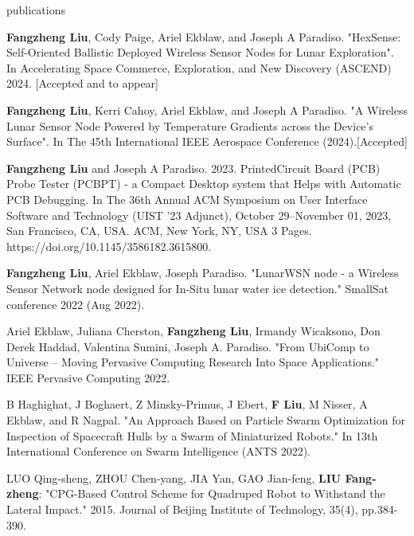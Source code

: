 \documentclass{resume} %
\begin{document}
\begin{rSection}{publications}
\begin{itemlabel}
\item \textbf{Fangzheng Liu}, Cody Paige, Ariel Ekblaw, and Joseph A Paradiso. "HexSense: Self-Oriented Ballistic Deployed Wireless Sensor Nodes for Lunar Exploration". In Accelerating Space Commerce, Exploration, and New Discovery (ASCEND) 2024. [Accepted and to appear]
\smallskip
\smallskip
\smallskip

\item \textbf{Fangzheng Liu}, Kerri Cahoy, Ariel Ekblaw, and Joseph A Paradiso. "A Wireless Lunar Sensor Node Powered by Temperature Gradients across the Device's Surface". In The 45th International IEEE Aerospace Conference (2024).[Accepted]
\smallskip
\smallskip
\smallskip

\item \textbf{Fangzheng Liu} and Joseph A Paradiso. 2023. PrintedCircuit Board (PCB) Probe Tester (PCBPT) - a Compact Desktop system that Helps with Automatic PCB Debugging. In The 36th Annual ACM Symposium on User Interface Software and Technology (UIST '23 Adjunct), October 29--November 01, 2023, San Francisco, CA, USA. ACM, New York, NY, USA 3 Pages. https://doi.org/10.1145/3586182.3615800.
\smallskip
\smallskip
\smallskip

\item \textbf{Fangzheng Liu}, Ariel Ekblaw, Joseph Paradiso. "LunarWSN node - a Wireless Sensor Network node designed for In-Situ lunar water ice detection." SmallSat conference 2022 (Aug 2022).
\smallskip
\smallskip
\smallskip

\item Ariel Ekblaw, Juliana Cherston, \textbf{Fangzheng Liu}, Irmandy Wicaksono, Don Derek Haddad, Valentina Sumini, Joseph A. Paradiso. "From UbiComp to Universe – Moving Pervasive Computing Research Into Space Applications." IEEE Pervasive Computing 2022.
\smallskip
\smallskip
\smallskip

\item B Haghighat, J Boghaert, Z Minsky-Primus, J Ebert, \textbf{F Liu}, M Nisser, A Ekblaw, and R Nagpal. "An Approach Based on Particle Swarm Optimization for Inspection of Spacecraft Hulls by a Swarm of Miniaturized Robots." In 13th International Conference on Swarm Intelligence (ANTS 2022).
\smallskip
\smallskip

\item LUO Qing-sheng, ZHOU Chen-yang, JIA Yan, GAO Jian-feng, \textbf{LIU Fang-zheng}: "CPG-Based Control Scheme for Quadruped Robot to Withstand the Lateral Impact." 2015. Journal of Beijing Institute of Technology, 35(4), pp.384-390.
\end{itemlabel}
\end{rSection}
\end{document}
